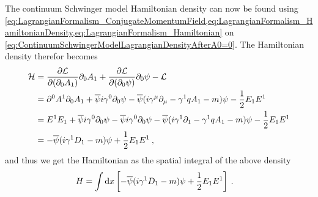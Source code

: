 \documentclass[../main.tex]{subfiles} %
\begin{document}
The continuum Schwinger model Hamiltonian density can now be found using \cref{eq:LagrangianFormalism_ConjugateMomentumField,eq:LagrangianFormalism_HamiltonianDensity,eq:LagrangianFormalism_Hamiltonian} on \cref{eq:ContinuumSchwingerModelLagrangianDensityAfterA0=0}. The Hamiltonian density therefor becomes
\begin{align} \label{eq:ContinuumSchwingerModelHamiltonianDensity}
\begin{split}
    \mathcal{H} &= \pdv{\mathcal{L}}{(\partial_0 A_1)} \partial_0 A_1 + \pdv{\mathcal{L}}{(\partial_0 \psi)} \partial_0 \psi - \mathcal{L} \\
        &= \partial^0 A^1 \partial_0 A_1 + \overline{\psi} i \gamma^0 \partial_0 \psi - \overline{\psi} (i \gamma^\mu \partial_\mu - \gamma^1 q A_1 - m) \psi - \frac{1}{2} E_1 E^1 \\
        &= E^1 E_1 + \overline{\psi} i \gamma^0 \partial_0 \psi - \overline{\psi} i \gamma^0 \partial_0 \psi - \overline{\psi} (i \gamma^1 \partial_1 - \gamma^1 q A_1 - m) \psi - \frac{1}{2} E_1 E^1 \\
        &= - \overline{\psi} (i \gamma^1 D_1 - m) \psi + \frac{1}{2} E_1 E^1 \: ,
\end{split}
\end{align}
and thus we get the Hamiltonian as the spatial integral of the above density
\begin{align}
    H &= \int \dd{x} \left[ - \overline{\psi} (i \gamma^1 D_1 - m) \psi + \frac{1}{2} E_1 E^1 \right] \: .
\end{align}
\end{document}
